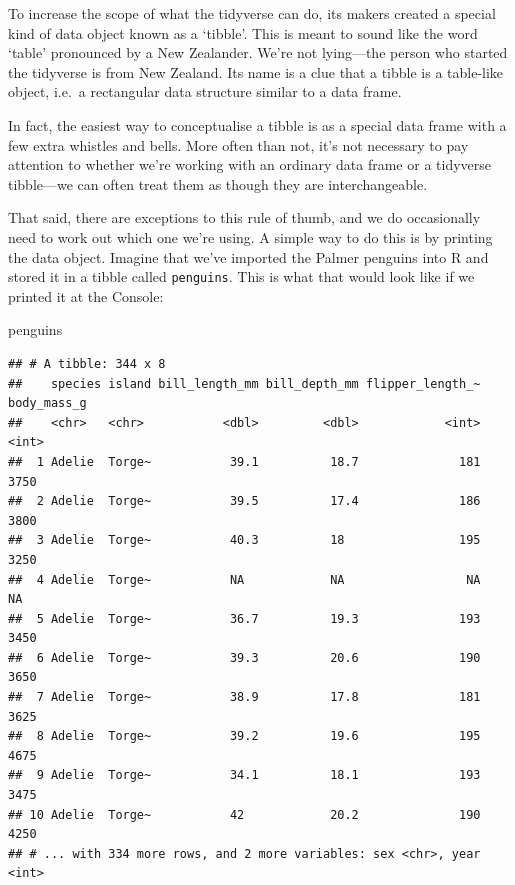 \documentclass[
]{book}
\newenvironment{Shaded}{\begin{snugshade}}{\end{snugshade}}
\newcommand{\NormalTok}[1]{#1}
\begin{document}
To increase the scope of what the tidyverse can do, its makers created a special kind of data object known as a `tibble'. This is meant to sound like the word `table' pronounced by a New Zealander. We're not lying---the person who started the tidyverse is from New Zealand. Its name is a clue that a tibble is a table-like object, i.e.~a rectangular data structure similar to a data frame.

In fact, the easiest way to conceptualise a tibble is as a special data frame with a few extra whistles and bells. More often than not, it's not necessary to pay attention to whether we're working with an ordinary data frame or a tidyverse tibble---we can often treat them as though they are interchangeable.

That said, there are exceptions to this rule of thumb, and we do occasionally need to work out which one we're using. A simple way to do this is by printing the data object. Imagine that we've imported the Palmer penguins into R and stored it in a tibble called \texttt{penguins}. This is what that would look like if we printed it at the Console:

\begin{Shaded}
\begin{Highlighting}[]
\NormalTok{penguins}
\end{Highlighting}
\end{Shaded}

\begin{verbatim}
## # A tibble: 344 x 8
##    species island bill_length_mm bill_depth_mm flipper_length_~ body_mass_g
##    <chr>   <chr>           <dbl>         <dbl>            <int>       <int>
##  1 Adelie  Torge~           39.1          18.7              181        3750
##  2 Adelie  Torge~           39.5          17.4              186        3800
##  3 Adelie  Torge~           40.3          18                195        3250
##  4 Adelie  Torge~           NA            NA                 NA          NA
##  5 Adelie  Torge~           36.7          19.3              193        3450
##  6 Adelie  Torge~           39.3          20.6              190        3650
##  7 Adelie  Torge~           38.9          17.8              181        3625
##  8 Adelie  Torge~           39.2          19.6              195        4675
##  9 Adelie  Torge~           34.1          18.1              193        3475
## 10 Adelie  Torge~           42            20.2              190        4250
## # ... with 334 more rows, and 2 more variables: sex <chr>, year <int>
\end{verbatim}
\end{document}

